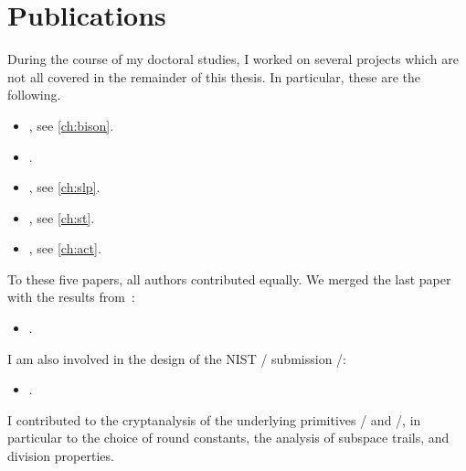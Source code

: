 \section{Publications}

During the course of my doctoral studies, I worked on several projects which are not all covered in the remainder of this thesis.
In particular, these are the following.

\begin{itemize}
    \item[] , see \cref{ch:bison}.
\end{itemize}

\begin{itemize}
    \item[] .
    \item[] , see \cref{ch:slp}.
    \item[] , see \cref{ch:st}.
\end{itemize}

\begin{itemize}
    \item[] , see \cref{ch:act}.
\end{itemize}
To these five papers, all authors contributed equally.
We merged the last paper with the results from~:
\begin{itemize}
    \item[] .
\end{itemize}
I am also involved in the design of the NIST \LWC/ submission \spook/:
\begin{itemize}
    \item[] .
\end{itemize}
I contributed to the cryptanalysis of the underlying primitives \clyde/ and \shadow/, in particular to the choice of round constants, the analysis of subspace trails, and division properties.

